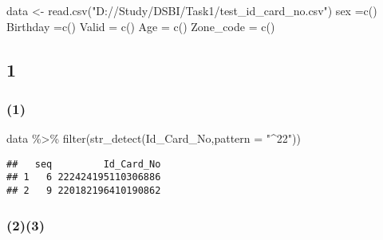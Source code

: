 \documentclass[
]{article}
\newenvironment{Shaded}{\begin{snugshade}}{\end{snugshade}}
\newcommand{\AttributeTok}[1]{\textcolor[rgb]{0.77,0.63,0.00}{#1}}
\newcommand{\FunctionTok}[1]{\textcolor[rgb]{0.00,0.00,0.00}{#1}}
\newcommand{\NormalTok}[1]{#1}
\newcommand{\OtherTok}[1]{\textcolor[rgb]{0.56,0.35,0.01}{#1}}
\newcommand{\SpecialCharTok}[1]{\textcolor[rgb]{0.00,0.00,0.00}{#1}}
\newcommand{\StringTok}[1]{\textcolor[rgb]{0.31,0.60,0.02}{#1}}
\begin{document}
\begin{Shaded}
\begin{Highlighting}[]
\NormalTok{data }\OtherTok{\textless{}{-}} \FunctionTok{read.csv}\NormalTok{(}\StringTok{"D://Study/DSBI/Task1/test\_id\_card\_no.csv"}\NormalTok{)}
\NormalTok{sex }\OtherTok{=}\FunctionTok{c}\NormalTok{()}
\NormalTok{Birthday }\OtherTok{=}\FunctionTok{c}\NormalTok{()}
\NormalTok{Valid }\OtherTok{=} \FunctionTok{c}\NormalTok{()}
\NormalTok{Age }\OtherTok{=} \FunctionTok{c}\NormalTok{()}
\NormalTok{Zone\_code }\OtherTok{=} \FunctionTok{c}\NormalTok{()}
\end{Highlighting}
\end{Shaded}

\hypertarget{section}{%
\subsection{1}\label{section}}

\hypertarget{section-1}{%
\subsubsection{(1)}\label{section-1}}

\begin{Shaded}
\begin{Highlighting}[]
\NormalTok{data }\SpecialCharTok{\%\textgreater{}\%} \FunctionTok{filter}\NormalTok{(}\FunctionTok{str\_detect}\NormalTok{(Id\_Card\_No,}\AttributeTok{pattern =} \StringTok{"\^{}22"}\NormalTok{))}
\end{Highlighting}
\end{Shaded}

\begin{verbatim}
##   seq         Id_Card_No
## 1   6 222424195110306886
## 2   9 220182196410190862
\end{verbatim}

\hypertarget{section-2}{%
\subsubsection{(2)(3)}\label{section-2}}
\end{document}

